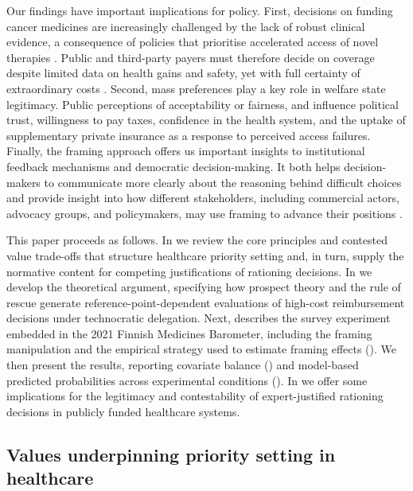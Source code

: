 \documentclass[11pt]{article}\usepackage[]{graphicx}\usepackage[]{xcolor}
\begin{document}
Our findings have important implications for policy. First, decisions on funding cancer medicines are increasingly challenged by the lack of robust clinical evidence, a consequence of policies that prioritise accelerated access of novel therapies \parencite{Hwang2020ExpeditedApprovalTherapeuticValue, VellaBonanno2017AdaptivePathways, Cohen2017CancerDrugsHighPrice, Davis2017EvidenceCancerDrugsEMA, Brinkhuis2024AddedBenefitRevenues}. Public and third-party payers must therefore decide on coverage despite limited data on health gains and safety, yet with full certainty of extraordinary costs \parencite{Cohen2017CancerDrugsHighPrice}. Second, mass preferences play a key role in welfare state legitimacy. Public perceptions of acceptability or fairness, and influence political trust, willingness to pay taxes, confidence in the health system, and the uptake of supplementary private insurance as a response to perceived access failures. Finally, the framing approach offers us important insights to institutional feedback mechanisms and democratic decision-making. It both helps decision-makers to communicate more clearly about the reasoning behind difficult choices and provide insight into how different stakeholders, including commercial actors, advocacy groups, and policymakers, may use framing to advance their positions \parencite{Greer2016StrengtheningGovernance,PinhoDiasCosta2020MassMediaObstacleRationing,Beland2016}.



This paper proceeds as follows. In  we review the core principles and contested value trade-offs that structure healthcare priority setting and, in turn, supply the normative content for competing justifications of rationing decisions. In  we develop the theoretical argument, specifying how prospect theory and the rule of rescue generate reference-point-dependent evaluations of high-cost reimbursement decisions under technocratic delegation. Next,  describes the survey experiment embedded in the 2021 Finnish Medicines Barometer, including the framing manipulation and the empirical strategy used to estimate framing effects (). We then present the results, reporting covariate balance () and model-based predicted probabilities across experimental conditions (). In  we offer some implications for the legitimacy and contestability of expert-justified rationing decisions in publicly funded healthcare systems.


\subsection{Values underpinning priority setting in healthcare}\label{values}
\end{document}
